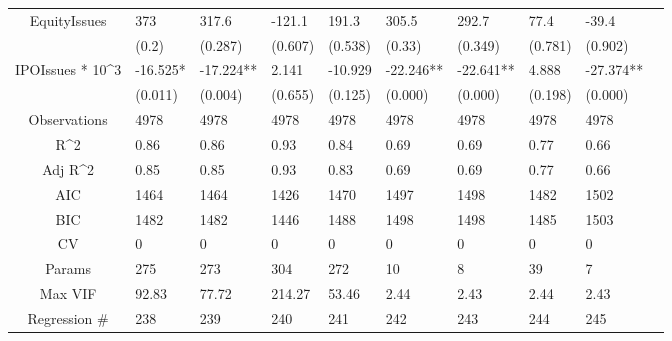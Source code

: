 \documentclass{article}
\begin{document}
\begin{table}[H]
\begin{tabular}{|clllllllll|}
  EquityIssues & 373 & 317.6 & -121.1 & 191.3 & 305.5 & 292.7 & 77.4 & -39.4 & \\ 
   & (0.2) & (0.287) & (0.607) & (0.538) & (0.33) & (0.349) & (0.781) & (0.902) & \\ 
  IPOIssues * 10^3 & -16.525* & -17.224** & 2.141 & -10.929 & -22.246** & -22.641** & 4.888 & -27.374** & \\ 
   & (0.011) & (0.004) & (0.655) & (0.125) & (0.000) & (0.000) & (0.198) & (0.000) & \\ 
  \hline 
 Observations & 4978 & 4978 & 4978 & 4978 & 4978 & 4978 & 4978 & 4978 & \\ 
  R^2 & 0.86 & 0.86 & 0.93 & 0.84 & 0.69 & 0.69 & 0.77 & 0.66 & \\ 
  Adj R^2 & 0.85 & 0.85 & 0.93 & 0.83 & 0.69 & 0.69 & 0.77 & 0.66 & \\ 
  AIC & 1464 & 1464 & 1426 & 1470 & 1497 & 1498 & 1482 & 1502 & \\ 
  BIC & 1482 & 1482 & 1446 & 1488 & 1498 & 1498 & 1485 & 1503 & \\ 
  CV & 0 & 0 & 0 & 0 & 0 & 0 & 0 & 0 & \\ 
  Params & 275 & 273 & 304 & 272 & 10 & 8 & 39 & 7 & \\ 
  Max VIF & 92.83 & 77.72 & 214.27 & 53.46 & 2.44 & 2.43 & 2.44 & 2.43 & \\ 
  Regression \# & 238 & 239 & 240 & 241 & 242 & 243 & 244 & 245 & \\ 
   \hline
\end{tabular}
 
\end{table}
\end{document}
